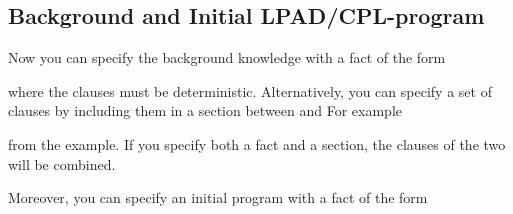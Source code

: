 \documentclass[letterpaper,10pt,english]{sphinxmanual}
\begin{document}
\subsection{Background and Initial LPAD/CPL-program}
\label{\detokenize{index:background-and-initial-lpad-cpl-program}}
Now you can specify the background knowledge with a fact of the form

\begin{sphinxVerbatim}[commandchars=\\\{\}]
    
\end{sphinxVerbatim}

where the clauses must be deterministic.
Alternatively, you can specify a set of clauses by including them in a section between  and 
For example

\begin{sphinxVerbatim}[commandchars=\\\{\}]
 

 
 

 
\end{sphinxVerbatim}

from the  example.
If you specify both a  fact and a section, the clauses of the two will be combined.

Moreover, you can specify an initial program with a fact of the form

\begin{sphinxVerbatim}[commandchars=\\\{\}]
    
\end{sphinxVerbatim}
\end{document}
